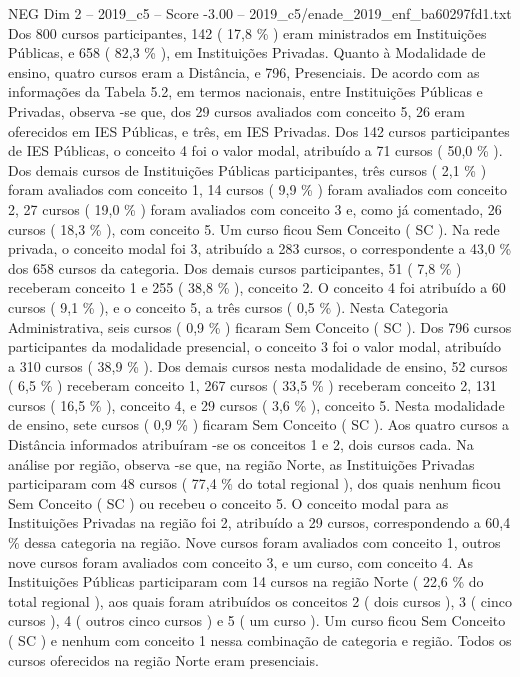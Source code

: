 \begin{textsample}{NEG Dim 2 – 2019\_c5 – Score -3.00 – 2019\_c5/enade\_2019\_enf\_ba60297fd1.txt}
Dos 800 cursos participantes, 142 ( 17,8 \% ) eram ministrados em Instituições Públicas, e 658 ( 82,3 \% ), em Instituições Privadas.
Quanto à Modalidade de ensino, quatro cursos eram a Distância, e 796, Presenciais.
De acordo com as informações da Tabela 5.2, em termos nacionais, entre Instituições Públicas e Privadas, observa -se que, dos 29 cursos avaliados com conceito 5, 26 eram oferecidos em IES Públicas, e três, em IES Privadas.
Dos 142 cursos participantes de IES Públicas, o conceito 4 foi o valor modal, atribuído a 71 cursos ( 50,0 \% ).
Dos demais cursos de Instituições Públicas participantes, três cursos ( 2,1 \% ) foram avaliados com conceito 1, 14 cursos ( 9,9 \% ) foram avaliados com conceito 2, 27 cursos ( 19,0 \% ) foram avaliados com conceito 3 e, como já comentado, 26 cursos ( 18,3 \% ), com conceito 5.
Um curso ficou Sem Conceito ( SC ).
Na rede privada, o conceito modal foi 3, atribuído a 283 cursos, o correspondente a 43,0 \% dos 658 cursos da categoria.
Dos demais cursos participantes, 51 ( 7,8 \% ) receberam conceito 1 e 255 ( 38,8 \% ), conceito 2.
O conceito 4 foi atribuído a 60 cursos ( 9,1 \% ), e o conceito 5, a três cursos ( 0,5 \% ).
Nesta Categoria Administrativa, seis cursos ( 0,9 \% ) ficaram Sem Conceito ( SC ).
Dos 796 cursos participantes da modalidade presencial, o conceito 3 foi o valor modal, atribuído a 310 cursos ( 38,9 \% ).
Dos demais cursos nesta modalidade de ensino, 52 cursos ( 6,5 \% ) receberam conceito 1, 267 cursos ( 33,5 \% ) receberam conceito 2, 131 cursos ( 16,5 \% ), conceito 4, e 29 cursos ( 3,6 \% ), conceito 5.
Nesta modalidade de ensino, sete cursos ( 0,9 \% ) ficaram Sem Conceito ( SC ).
Aos quatro cursos a Distância informados atribuíram -se os conceitos 1 e 2, dois cursos cada.
Na análise por região, observa -se que, na região Norte, as Instituições Privadas participaram com 48 cursos ( 77,4 \% do total regional ), dos quais nenhum ficou Sem Conceito ( SC ) ou recebeu o conceito 5.
O conceito modal para as Instituições Privadas na região foi 2, atribuído a 29 cursos, correspondendo a 60,4 \% dessa categoria na região.
Nove cursos foram avaliados com conceito 1, outros nove cursos foram avaliados com conceito 3, e um curso, com conceito 4.
As Instituições Públicas participaram com 14 cursos na região Norte ( 22,6 \% do total regional ), aos quais foram atribuídos os conceitos 2 ( dois cursos ), 3 ( cinco cursos ), 4 ( outros cinco cursos ) e 5 ( um curso ).
Um curso ficou Sem Conceito ( SC ) e nenhum com conceito 1 nessa combinação de categoria e região.
Todos os cursos oferecidos na região Norte eram presenciais.

\end{textsample}
